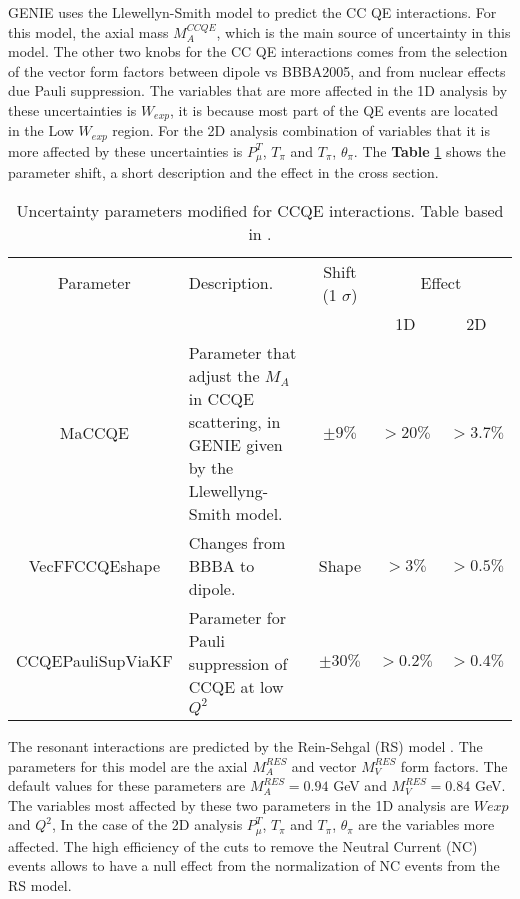 GENIE uses the Llewellyn-Smith model to predict the CC QE interactions. For this model, the axial mass $M^{CCQE}_A$, which is the main source of uncertainty in this model. The other two knobs for the CC QE interactions comes from the selection of the vector form factors between dipole vs BBBA2005, and from nuclear effects due Pauli suppression. The variables that are more affected in the 1D analysis by these uncertainties is $W_{exp}$, it is because most part of the QE events are located in the Low $W_{exp}$ region. For the 2D analysis combination of variables that it is more affected by these uncertainties is $P^T_\mu$, $T_\pi$ and $T_\pi$, $\theta_\pi$. The \textbf{Table} \ref{tab:ErrorAnalysis:SystematicUnc:GenieCCQEmodels} shows the parameter shift, a short description and the effect in the cross section. 
 
\begin{table}[!htb]
    \centering
    \begin{tabular}{c|p{1.5in}|c|c|c}
        \hline 
        Parameter & Description.  & Shift (1 $\sigma$) & \multicolumn{2}{c}{Effect} \\
         & & & 1D & 2D \\
        \hline  
        MaCCQE & Parameter that adjust the $M_A$ in CCQE scattering, in GENIE given by the Llewellyng-Smith model. & $\pm9\%$ & $>20\%$ & $>3.7\%$ \\ \hline
        VecFFCCQEshape & Changes from BBBA to dipole. & Shape & $>3\%$ & $>0.5\%$ \\
        \hline
        CCQEPauliSupViaKF & Parameter for Pauli suppression of CCQE at low $Q^2$ &$\pm30\%$ & $>0.2\%$ & $>0.4\%$ \\ \hline
        
    \end{tabular}
    \caption{Uncertainty parameters modified for CCQE interactions. Table based in \cite{GENIEUnc}.}
    \label{tab:ErrorAnalysis:SystematicUnc:GenieCCQEmodels}
\end{table}

The resonant interactions are predicted by the Rein-Sehgal (RS) model \cite{REIN198179}. The parameters for this model are the axial $M^{RES}_A$ and vector $M^{RES}_V$ form factors. The default values for these parameters are $M^{RES}_A=0.94$ GeV and $M^{RES}_V =0.84$ GeV. The variables most affected by these two parameters in the 1D analysis are $W{exp}$ and $Q^2$, In the case of the 2D analysis $P^T_\mu$, $T_\pi$ and $T_\pi$, $\theta_\pi$ are the variables more affected. The high efficiency of the cuts to remove the Neutral Current (NC) events allows to have a null effect from the normalization of NC events from the RS model.

